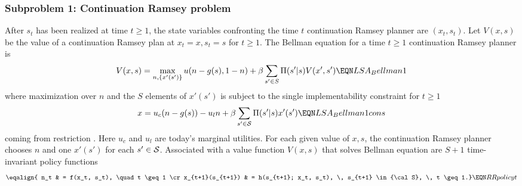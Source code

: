 \subsubsection{Subproblem 1: Continuation Ramsey problem}
 After $s_t$ has been realized at time $t \geq 1$, the state variables confronting the
time $t$ continuation Ramsey planner  are $(x_t, s_t)$.  Let $V(x, s)$ be the  value of a continuation
Ramsey plan at $x_t = x, s_t =s$ for $t \geq 1$.
The  Bellman equation for a time $t \geq 1$ continuation Ramsey planner is
$$ V(x, s) = \max_{n, \{x'(s')\}} u(n-g(s), 1-n) + \beta \sum_{s'\in S} \Pi(s'| s) V(x', s') \EQN LSA_Bellman1 $$
where  maximization over $n$ and the  $S$ elements of $x'(s')$ is subject to the
single implementability constraint for $t \geq 1$
$$ x = u_c(n-g(s)) -  u_l n + \beta \sum_{s' \in {\cal S}} \Pi(s'|s) x'(s')   \EQN LSA_Bellman1cons $$
coming from restriction .
Here $u_c$ and $u_l$ are today's  marginal utilities.
For each given value of $x, s$, the continuation Ramsey planner chooses $n$ and  one $x'(s')$ for each $s' \in {\cal S}$.
Associated with a value function $V(x,s)$ that solves  Bellman equation  are $S+1$ time-invariant  policy functions
$$ \eqalign{ n_t & = f(x_t, s_t), \quad t \geq 1 \cr
             x_{t+1}(s_{t+1}) & = h(s_{t+1}; x_t, s_t), \, s_{t+1} \in  {\cal S}, \, t \geq 1.} \EQN RRpolicyt $$

